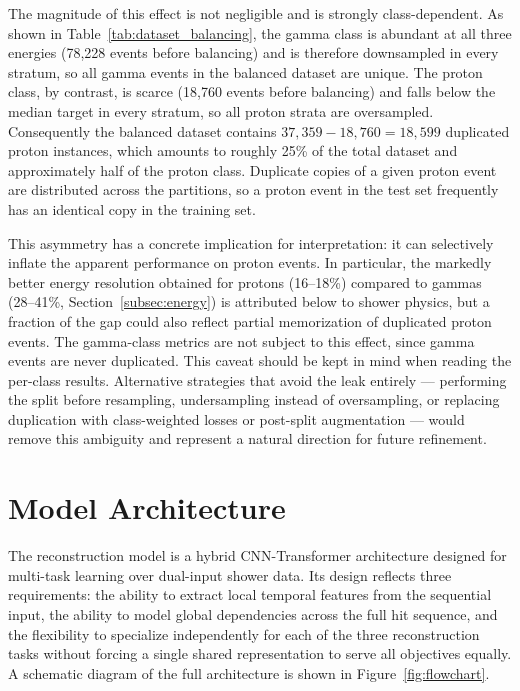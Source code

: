 The magnitude of this effect is not negligible and is strongly class-dependent. As shown in Table~\ref{tab:dataset_balancing}, the gamma class is abundant at all three energies (78,228 events before balancing) and is therefore downsampled in every stratum, so all gamma events in the balanced dataset are unique. The proton class, by contrast, is scarce (18,760 events before balancing) and falls below the median target in every stratum, so all proton strata are oversampled. Consequently the balanced dataset contains $37{,}359 - 18{,}760 = 18{,}599$ duplicated proton instances, which amounts to roughly 25\% of the total dataset and approximately half of the proton class. Duplicate copies of a given proton event are distributed across the partitions, so a proton event in the test set frequently has an identical copy in the training set.

This asymmetry has a concrete implication for interpretation: it can selectively inflate the apparent performance on proton events. In particular, the markedly better energy resolution obtained for protons (16--18\%) compared to gammas (28--41\%, Section~\ref{subsec:energy}) is attributed below to shower physics, but a fraction of the gap could also reflect partial memorization of duplicated proton events. The gamma-class metrics are not subject to this effect, since gamma events are never duplicated. This caveat should be kept in mind when reading the per-class results. Alternative strategies that avoid the leak entirely --- performing the split before resampling, undersampling instead of oversampling, or replacing duplication with class-weighted losses or post-split augmentation --- would remove this ambiguity and represent a natural direction for future refinement.

\section{Model Architecture}

The reconstruction model is a hybrid CNN-Transformer architecture designed for multi-task learning over dual-input shower data. Its design reflects three requirements: the ability to extract local temporal features from the sequential input, the ability to model global dependencies across the full hit sequence, and the flexibility to specialize independently for each of the three reconstruction tasks without forcing a single shared representation to serve all objectives equally. A schematic diagram of the full architecture is shown in Figure~\ref{fig:flowchart}.

